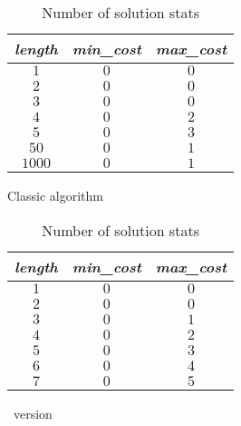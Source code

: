 \begin{table}
  \centering
  \begin{subtable}{.47\linewidth}
    \centering
    \begin{tabular}{ccc}
      \textit{length} & \textit{min\_cost} & \textit{max\_cost} \\
      \hline
      $1$             & $0$                & $0$                \\
      $2$             & $0$                & $0$                \\
      $3$             & $0$                & $0$                \\
      $4$             & $0$                & $2$                \\
      $5$             & $0$                & $3$                \\
      $50$            & $0$                & $1$                \\
      $1000$          & $0$                & $1$                \\
    \end{tabular}
    \caption{Classic algorithm}
    \label{tbl:sol_stats1}
  \end{subtable}
  \quad
  \begin{subtable}{.47\linewidth}
    \centering
    \begin{tabular}{ccc}
      \textit{length} & \textit{min\_cost} & \textit{max\_cost} \\
      \hline
      $1$             & $0$                & $0$                \\
      $2$             & $0$                & $0$                \\
      $3$             & $0$                & $1$                \\
      $4$             & $0$                & $2$                \\
      $5$             & $0$                & $3$                \\
      $6$             & $0$                & $4$                \\
      $7$             & $0$                & $5$                \\
    \end{tabular}
    \caption{\alldiff\ version}
    \label{tbl:sol_stats2}
  \end{subtable}

  \caption[short]{Number of solution stats}
  \label{tbl:sol_stats}
\end{table}

